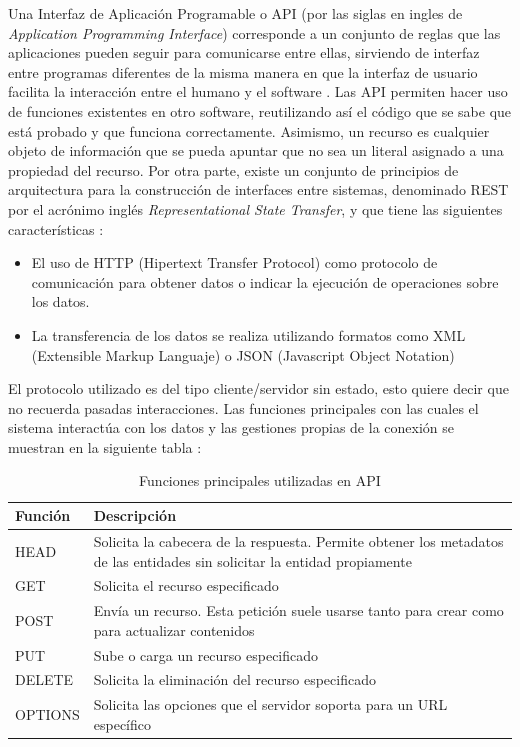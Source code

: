 Una Interfaz de Aplicación Programable o API (por las siglas en ingles de \textit{Application Programming Interface}) corresponde a un conjunto de reglas que las aplicaciones pueden seguir para comunicarse entre ellas, sirviendo de interfaz entre programas diferentes de la misma manera en que la interfaz de usuario facilita la interacción entre el humano y el software \parencite{merino2014}. Las API permiten hacer uso de funciones existentes en otro software, reutilizando así el código que se sabe que está probado y que funciona correctamente. Asimismo, un recurso es cualquier objeto de información que se pueda apuntar que no sea un literal asignado a una propiedad del recurso. Por otra parte, existe un conjunto de principios de arquitectura para la construcción de interfaces entre sistemas, denominado REST por el acrónimo inglés \textit{Representational State Transfer}, y que tiene las siguientes características \parencite{aporta2019}:
\begin{itemize}
\item El uso de HTTP (Hipertext Transfer Protocol) como protocolo de comunicación para obtener datos o indicar la ejecución de operaciones sobre los datos.
\item La transferencia de los datos se realiza utilizando formatos como XML (Extensible Markup Languaje) o JSON (Javascript Object Notation)
\end{itemize}

El protocolo utilizado es del tipo cliente/servidor sin estado, esto quiere decir que no recuerda pasadas interacciones. Las funciones principales con las cuales el sistema interactúa con los datos y las gestiones propias de la conexión se muestran en la siguiente tabla \parencite{aporta2019}:

\begin{table}[H]
\centering
\begin{tabular}{|p{2cm}|p{4cm}|}
\hline
Función&Descripción\\
\hline
HEAD & Solicita la cabecera de la respuesta. Permite obtener los metadatos de las entidades sin solicitar la entidad propiamente\\
\hline
GET&Solicita el recurso especificado\\
\hline
POST&Envía un recurso. Esta petición suele usarse tanto para crear como para actualizar contenidos\\
\hline
PUT&Sube o carga un recurso especificado\\
\hline
DELETE&Solicita la eliminación del recurso especificado\\
\hline
OPTIONS&Solicita las opciones que el servidor soporta para un URL específico\\
\hline
\end{tabular}
\caption{Funciones principales utilizadas en API \parencite{aporta2019}}
\end{table}

